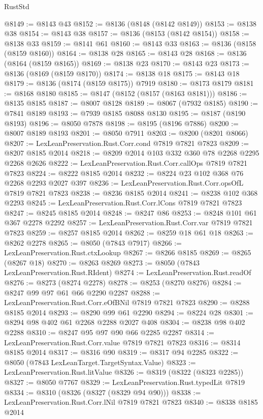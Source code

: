 \begin{lexlean}{RustStd}
\begin{coremodule}
@8149 := @8143 @43
@8152 := @8136 (@8148 (@8142 @8149))
@8153 := @8138 @38
@8154 := @8143 @38
@8157 := @8136 (@8153 (@8142 @8154))
@8158 := @8138 @33
@8159 := @8141 @61
@8160 := @8143 @33
@8163 := @8136 (@8158 (@8159 @8160))
@8164 := @8138 @28
@8165 := @8143 @28
@8168 := @8136 (@8164 (@8159 @8165))
@8169 := @8138 @23
@8170 := @8143 @23
@8173 := @8136 (@8169 (@8159 @8170))
@8174 := @8138 @18
@8175 := @8143 @18
@8179 := @8136 (@8174 (@8159 @8175)) @7919
@8180 := @8173 @8179
@8181 := @8168 @8180
@8185 := @8147 (@8152 (@8157 (@8163 @8181)))
@8186 := @8135 @8185
@8187 := @8007 @8128
@8189 := @8067 (@7932 @8185)
@8190 := @7841 @8189
@8193 := @7939 @8185 @8088 @8130
@8195 := @8187 (@8190 @8193)
@8196 := @8050 @7878
@8198 := @8195 (@8196 @7886)
@8200 := @8007 @8189 @8193
@8201 := @8050 @7911
@8203 := @8200 (@8201 @8066)
@8207 := LexLeanPreservation.Rust.Corr.cond @7819 @7821 @7823
@8209 := @8207 @8185 @2014
@8218 := @8209 @2014 @103 @332 @360 @78 @2268 @2295 @2268 @2626
@8222 := LexLeanPreservation.Rust.Corr.callOps @7819 @7821 @7823
@8224 := @8222 @8185 @2014
@8232 := @8224 @23 @102 @368 @76 @2268 @2293 @2027 @397
@8236 := LexLeanPreservation.Rust.Corr.opsOfL @7819 @7821 @7823
@8238 := @8236 @8185 @2014
@8241 := @8238 @102 @368 @2293
@8245 := LexLeanPreservation.Rust.Corr.lCons @7819 @7821 @7823
@8247 := @8245 @8185 @2014
@8248 := @8247 @86
@8253 := @8248 @101 @61 @367 @2278 @2292
@8257 := LexLeanPreservation.Rust.Corr.var @7819 @7821 @7823
@8259 := @8257 @8185 @2014
@8262 := @8259 @18 @61 @18
@8263 := @8262 @2278
@8265 := @8050 (@7843 @7917)
@8266 := LexLeanPreservation.Rust.ctxLookup
@8267 := @8266 @8185
@8269 := @8265 (@8267 @18)
@8270 := @8263 @8269
@8273 := @8050 (@7843 LexLeanPreservation.Rust.RIdent)
@8274 := LexLeanPreservation.Rust.readOf
@8276 := @8273 (@8274 @2278)
@8278 := @8253 (@8270 @8276)
@8284 := @8247 @99 @97 @61 @66 @2290 @2287
@8288 := LexLeanPreservation.Rust.Corr.eOfBNil @7819 @7821 @7823
@8290 := @8288 @8185 @2014
@8293 := @8290 @99 @61 @2290
@8294 := @8224 @28
@8301 := @8294 @98 @402 @61 @2268 @2288 @2027 @408
@8304 := @8238 @98 @402 @2288
@8310 := @8247 @95 @97 @90 @66 @2285 @2287
@8314 := LexLeanPreservation.Rust.Corr.value @7819 @7821 @7823
@8316 := @8314 @8185 @2014
@8317 := @8316 @90
@8319 := @8317 @94 @2285
@8322 := @8050 (@7843 LexLeanTarget.TargetSyntax.Value)
@8323 := LexLeanPreservation.Rust.litValue
@8326 := @8319 (@8322 (@8323 @2285))
@8327 := @8050 @7767
@8329 := LexLeanPreservation.Rust.typedLit @7819
@8334 := @8310 (@8326 (@8327 (@8329 @94 @90)))
@8338 := LexLeanPreservation.Rust.Corr.lNil @7819 @7821 @7823
@8340 := @8338 @8185 @2014

\end{coremodule}
\end{lexlean}
